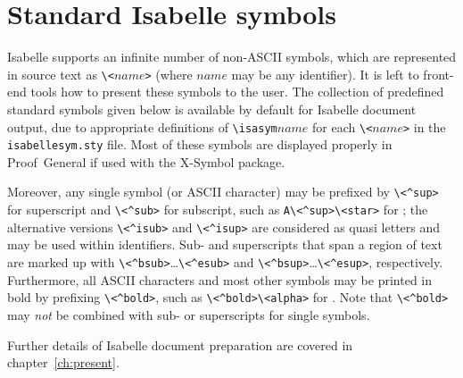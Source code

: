 

\chapter{Standard Isabelle symbols}\label{app:symbols}

Isabelle supports an infinite number of non-ASCII symbols, which are
represented in source text as \verb,\<,$name$\verb,>, (where $name$ may be any
identifier).  It is left to front-end tools how to present these symbols to
the user.  The collection of predefined standard symbols given below is
available by default for Isabelle document output, due to appropriate
definitions of \verb,\isasym,$name$ for each \verb,\<,$name$\verb,>, in the
\verb,isabellesym.sty, file.  Most of these symbols are displayed properly in
Proof~General if used with the X-Symbol package.

Moreover, any single symbol (or ASCII character) may be prefixed by
\verb,\<^sup>, for superscript and \verb,\<^sub>, for subscript, such as
\verb,A\<^sup>\<star>, for ; the alternative
versions \verb,\<^isub>, and \verb,\<^isup>, are considered as quasi letters
and may be used within identifiers.  Sub- and superscripts that span a region
of text are marked up with \verb,\<^bsub>,\dots\verb,\<^esub>, and
\verb,\<^bsup>,\dots\verb,\<^esup>,, respectively.  Furthermore, all ASCII
characters and most other symbols may be printed in bold by prefixing
\verb,\<^bold>,, such as \verb,\<^bold>\<alpha>, for
\isa{\isactrlbold{\isasymalpha}}.  Note that \verb,\<^bold>, may \emph{not} be
combined with sub- or superscripts for single symbols.

Further details of Isabelle document preparation are covered in
chapter~\ref{ch:present}.

\begin{center}
  \begin{isabellebody}
      
  \end{isabellebody}
\end{center}

